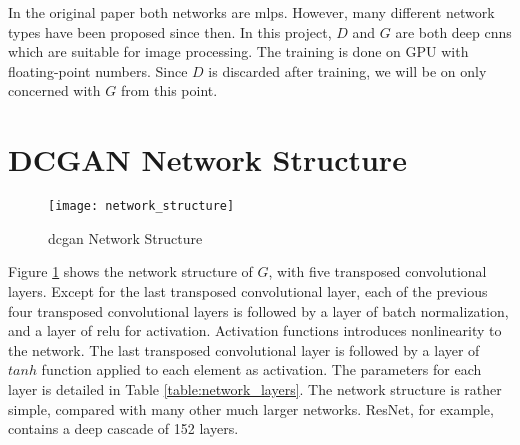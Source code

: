 In the original paper both networks are \glspl{mlp}. However, many different network types have been
proposed since then. In this project, $D$ and $G$ are both deep \glspl{cnn} \cite{radford}
which are suitable for image processing. The training is done on GPU with floating-point numbers. Since $D$ is
discarded after training, we will be on only concerned with $G$ from this point.

\section{DCGAN Network Structure}

\begin{figure}[h]
  \centering
  \texttt{[image: network\_structure]}
  \caption{\gls{dcgan} \cite{radford:conv_gan} Network Structure}
  \label{fig:network_structure}
\end{figure}

Figure \ref{fig:network_structure} shows the network structure of $G$, with five transposed convolutional
layers. Except for the last transposed convolutional layer, each of the previous four transposed convolutional
layers is followed by a layer of batch normalization, and a layer of \gls{relu} for
activation. Activation functions introduces nonlinearity to the network. The last transposed convolutional
layer is followed by a layer of $tanh$ function applied to each element as activation. The parameters for
each layer is detailed in Table \ref{table:network_layers}.  The network structure is rather simple,
compared with many other much larger networks. ResNet, for example, contains a deep cascade of 152 layers.

